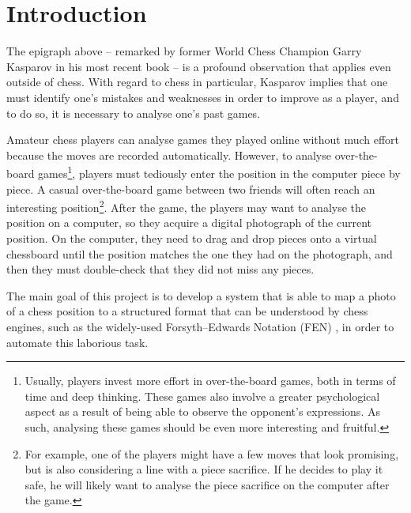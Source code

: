\documentclass[../report.tex]{subfiles}
\begin{document}
\chapter{Introduction}
\label{chap:introduction}

The epigraph above -- remarked by former World Chess Champion Garry Kasparov in his most recent book \cite{kasparov2018} -- is a profound observation that applies even outside of chess.
With regard to chess in particular, Kasparov implies that one must identify one's mistakes and weaknesses in order to improve as a player, and to do so, it is necessary to analyse one's past games. 

Amateur chess players can analyse games they played online without much effort because the moves are recorded automatically.
However, to analyse over-the-board games\footnote{Usually, players invest more effort in over-the-board games, both in terms of time and deep thinking. These games also involve a greater psychological aspect as a result of being able to observe the opponent's expressions. As such, analysing these games should be even more interesting and fruitful.}, players must tediously enter the position in the computer piece by piece.
A casual over-the-board game between two friends will often reach an interesting position\footnote{For example, one of the players might have a few moves that look promising, but is also considering a line with a piece sacrifice. If he decides to play it safe, he will likely want to analyse the piece sacrifice on the computer after the game.}. 
After the game, the players may want to analyse the position on a computer, so they acquire a digital photograph of the current position.
On the computer, they need to drag and drop pieces onto a virtual chessboard until the position matches the one they had on the photograph, and then they must double-check that they did not miss any pieces.

The main goal of this project is to develop a system that is able to map a photo of a chess position to a structured format that can be understood by chess engines, such as the widely-used Forsyth–Edwards Notation (FEN) \cite{edwards1994}, in order to automate this laborious task.






\end{document}
